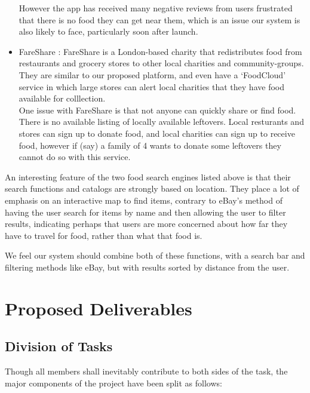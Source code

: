 \documentclass[12pt]{article}
\begin{document}
\begin{itemize}
        However the app has received many negative reviews from users frustrated
        that there is no food they can get near them, which is an issue our
        system is also likely to face, particularly soon after launch.
        
    \item FareShare \cite{fareshare}:
		FareShare is a London-based charity that redistributes food from restaurants
		and grocery stores to other local charities and community-groups. They are similar
		to our proposed platform, and even have a `FoodCloud' service in which large stores
		can alert local charities that they have food available for colllection.\\
		One issue with FareShare is that not anyone can quickly share or find food. There is no available listing of locally available leftovers.
		Local resturants and stores can sign up to donate food, and local charities can sign up to receive food, however
		if (say) a family of 4 wants to donate some leftovers they cannot do so with this service.
\end{itemize}

An interesting feature of the two food search engines listed above is that
their search functions and catalogs are strongly based on location.
They place a lot of emphasis on an interactive map to find items, contrary to
eBay’s method of having the user search for items by name and then allowing
the user to filter results, indicating perhaps that users are more concerned
about how far they have to travel for food, rather than what that food is.

We feel our system should combine both of these functions, with a search bar
and filtering methods like eBay, but with results sorted by distance from the user.

\pagebreak

\section{Proposed Deliverables}
\subsection{Division of Tasks}

Though all members shall inevitably contribute to both sides of the task,
the major components of the project have been split as follows:
\end{document}
